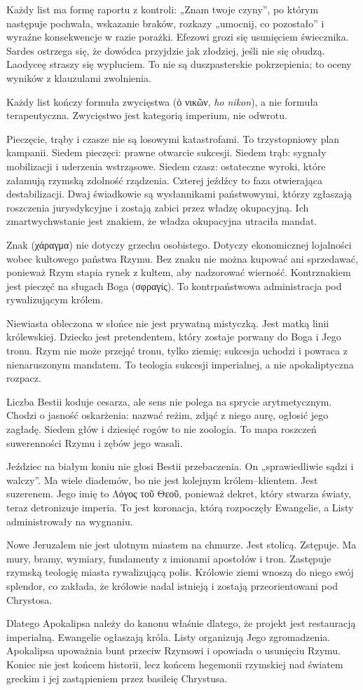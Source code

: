 Każdy list ma formę raportu z kontroli: „Znam twoje czyny”, po którym następuje pochwała, wskazanie braków, rozkazy „umocnij, co pozostało” i wyraźne konsekwencje w razie porażki.
Efezowi grozi się usunięciem świecznika.
Sardes ostrzega się, że dowódca przyjdzie jak złodziej, jeśli nie się obudzą.
Laodyceę straszy się wypluciem.
To nie są duszpasterskie pokrzepienia; to oceny wyników z klauzulami zwolnienia.

Każdy list kończy formuła zwycięstwa (ὁ νικῶν, \textit{ho nikon}), a nie formuła terapeutyczna.
Zwycięstwo jest kategorią imperium, nie odwrotu.

Pieczęcie, trąby i czasze nie są losowymi katastrofami.
To trzystopniowy plan kampanii.
Siedem pieczęci: prawne otwarcie sukcesji.
Siedem trąb: sygnały mobilizacji i uderzenia wstrząsowe.
Siedem czasz: ostateczne wyroki, które załamują rzymską zdolność rządzenia.
Czterej jeźdźcy to faza otwierająca destabilizacji.
Dwaj świadkowie są wysłannikami państwowymi, którzy zgłaszają roszczenia jurysdykcyjne i zostają zabici przez władzę okupacyjną.
Ich zmartwychwstanie jest znakiem, że władza okupacyjna utraciła mandat.

Znak (χάραγμα) nie dotyczy grzechu osobistego.
Dotyczy ekonomicznej lojalności wobec kultowego państwa Rzymu.
Bez znaku nie można kupować ani sprzedawać, ponieważ Rzym stapia rynek z kultem, aby nadzorować wierność.
Kontrznakiem jest pieczęć na sługach Boga (σφραγίς).
To kontrpaństwowa administracja pod rywalizującym królem.

Niewiasta obleczona w słońce nie jest prywatną mistyczką.
Jest matką linii królewskiej.
Dziecko jest pretendentem, który zostaje porwany do Boga i Jego tronu.
Rzym nie może przejąć tronu, tylko ziemię; sukcesja uchodzi i powraca z nienaruszonym mandatem.
To teologia sukcesji imperialnej, a nie apokaliptyczna rozpacz.

Liczba Bestii koduje cesarza, ale sens nie polega na sprycie arytmetycznym.
Chodzi o jasność oskarżenia: nazwać reżim, zdjąć z niego aurę, ogłosić jego zagładę.
Siedem głów i dziesięć rogów to nie zoologia.
To mapa roszczeń suwerenności Rzymu i zębów jego wasali.

Jeździec na białym koniu nie głosi Bestii przebaczenia.
On „sprawiedliwie sądzi i walczy”.
Ma wiele diademów, bo nie jest kolejnym królem–klientem.
Jest suzerenem.
Jego imię to Λόγος τοῦ Θεοῦ, ponieważ dekret, który stwarza światy, teraz detronizuje imperia.
To jest koronacja, którą rozpoczęły Ewangelie, a Listy administrowały na wygnaniu.

Nowe Jeruzalem nie jest ulotnym miastem na chmurze.
Jest stolicą.
Zstępuje.
Ma mury, bramy, wymiary, fundamenty z imionami apostołów i tron.
Zastępuje rzymską teologię miasta rywalizującą polis.
Królowie ziemi wnoszą do niego swój splendor, co zakłada, że królowie nadal istnieją i zostają przeorientowani pod Chrystosa.

Dlatego Apokalipsa należy do kanonu właśnie dlatego, że projekt jest restauracją imperialną.
Ewangelie ogłaszają króla.
Listy organizują Jego zgromadzenia.
Apokalipsa upoważnia bunt przeciw Rzymowi i opowiada o usunięciu Rzymu.
Koniec nie jest końcem historii, lecz końcem hegemonii rzymskiej nad światem greckim i jej zastąpieniem przez basileię Chrystusa.
